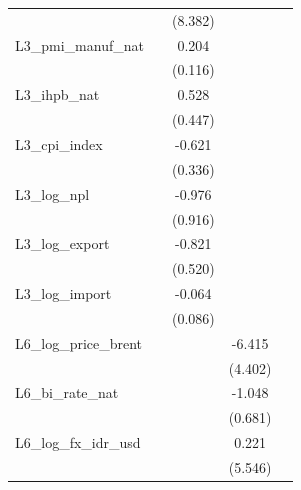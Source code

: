 {\begin{tabular}{l*{4}{c}}
                &                  &  (8.382)         &                  &                  \\
\addlinespace
L3\_pmi\_manuf\_nat&                  &    0.204\sym{*}  &                  &                  \\
                &                  &  (0.116)         &                  &                  \\
\addlinespace
L3\_ihpb\_nat     &                  &    0.528         &                  &                  \\
                &                  &  (0.447)         &                  &                  \\
\addlinespace
L3\_cpi\_index    &                  &   -0.621\sym{*}  &                  &                  \\
                &                  &  (0.336)         &                  &                  \\
\addlinespace
L3\_log\_npl      &                  &   -0.976         &                  &                  \\
                &                  &  (0.916)         &                  &                  \\
\addlinespace
L3\_log\_export   &                  &   -0.821         &                  &                  \\
                &                  &  (0.520)         &                  &                  \\
\addlinespace
L3\_log\_import   &                  &   -0.064         &                  &                  \\
                &                  &  (0.086)         &                  &                  \\
\addlinespace
L6\_log\_price\_brent&                  &                  &   -6.415         &                  \\
                &                  &                  &  (4.402)         &                  \\
\addlinespace
L6\_bi\_rate\_nat  &                  &                  &   -1.048         &                  \\
                &                  &                  &  (0.681)         &                  \\
\addlinespace
L6\_log\_fx\_idr\_usd&                  &                  &    0.221         &                  \\
                &                  &                  &  (5.546)         &                  \\

\end{tabular}}
